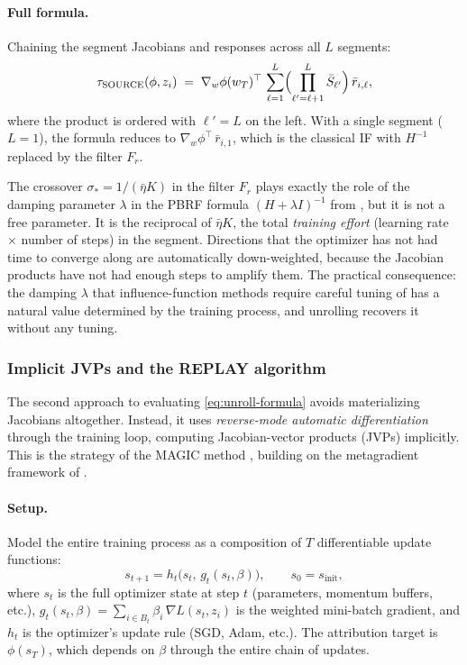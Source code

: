 \documentclass[11pt]{article}
\begin{document}
\paragraph{Full formula.} Chaining the segment Jacobians and responses across all $L$ segments:
\begin{equation}\label{eq:source-formula}
  \tau_{\mathrm{SOURCE}}(\phi,z_i) \;=\; \nabla_w\phi(w_T)^\top\,\sum_{\ell=1}^{L}\Bigl(\prod_{\ell'=\ell+1}^{L}\bar{S}_{\ell'}\Bigr)\,\bar{r}_{i,\ell},
\end{equation}
where the product is ordered with $\ell' = L$ on the left. With a single segment ($L=1$), the formula reduces to $\nabla_w\phi^\top\,\bar{r}_{i,1}$, which is the classical IF with $H^{-1}$ replaced by the filter $F_r$.

\begin{remark}\label{rem:unroll-damping}
The crossover $\sigma_* = 1/(\bar\eta K)$ in the filter $F_r$ plays exactly the role of the damping parameter $\lambda$ in the PBRF formula $(H + \lambda I)^{-1}$ from , but it is not a free parameter. It is the reciprocal of $\bar\eta K$, the total \emph{training effort} (learning rate $\times$ number of steps) in the segment. Directions that the optimizer has not had time to converge along are automatically down-weighted, because the Jacobian products have not had enough steps to amplify them. The practical consequence: the damping $\lambda$ that influence-function methods require careful tuning of has a natural value determined by the training process, and unrolling recovers it without any tuning.
\end{remark}

\subsubsection{Implicit JVPs and the REPLAY algorithm}\label{subsec:implicit-jvp}

The second approach to evaluating \eqref{eq:unroll-formula} avoids materializing Jacobians altogether. Instead, it uses \emph{reverse-mode automatic differentiation} through the training loop, computing Jacobian-vector products (JVPs) implicitly. This is the strategy of the MAGIC method \citep{ilyas2025magic}, building on the metagradient framework of \citet{engstrom2025optimizing}. 

\paragraph{Setup.} Model the entire training process as a composition of $T$ differentiable update functions:
\begin{equation}\label{eq:iterative-training}
  s_{t+1} = h_t\bigl(s_t,\, g_t(s_t,\beta)\bigr), \qquad s_0 = s_{\mathrm{init}},
\end{equation}
where $s_t$ is the full optimizer state at step $t$ (parameters, momentum buffers, etc.), $g_t(s_t,\beta) = \sum_{i\in B_t}\beta_i\,\nabla L(s_t,z_i)$ is the weighted mini-batch gradient, and $h_t$ is the optimizer's update rule (SGD, Adam, etc.). The attribution target is $\phi(s_T)$, which depends on $\beta$ through the entire chain of updates.
\end{document}

